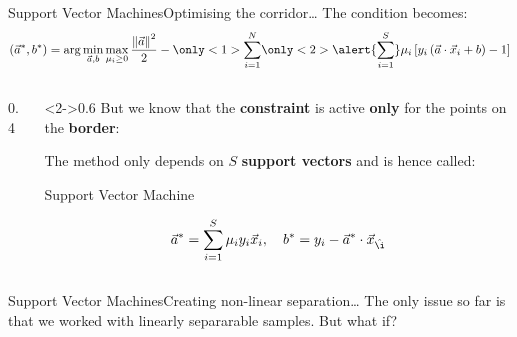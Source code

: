 \begin{frame}{Support Vector Machines}{Optimising the corridor\dots}
    The condition becomes:
    \begin{equation*}
        \left(\vec{a}^*, b^*\right)
        =
        \arg\min\limits_{\vec{a}, b}
        \max\limits_{\mu_i \ge 0}
        \frac{\norm{\vec{a}}^2}{2}
        -
        \only<1>{\sum\limits_{i = 1}^N}
        \only<2>{\alert{\sum\limits_{i = 1}^S}}
        \mu_i \left[ y_i \left( \vec{a} \cdot \vec{x}_i + b\right) - 1 \right]
    \end{equation*}
    \vfill
    \begin{columns}[c]
        \begin{column}{0.4\textwidth}
            \centering
            
        \end{column}
        \hfil
        \begin{column}<2->{0.6\textwidth}
            But we know that the \textbf{constraint} is active \textbf{only} for the points on the \textbf{border}:

            \begin{center}
                \large
                The method only depends on $S$ \textbf{support vectors} and is hence called:

                \vspace{0.5em}

                {\huge
                    Support Vector Machine
                }
            \end{center}

            \begin{equation*}
                \vec{a}^{*}
                =
                \sum\limits_{i = 1}^S \mu_i y_i \vec{x}_i,
                \quad
                b^*
                =
                y_i - \vec{a}^* \cdot \vec{x}_{\hat\i}
            \end{equation*}
        \end{column}
    \end{columns}
\end{frame}

\begin{frame}{Support Vector Machines}{Creating non-linear separation\dots}
    The only issue so far is that we worked with linearly separarable samples.
    But what if?
    \vfill
    \begin{center}
        
    \end{center}
\end{frame}

